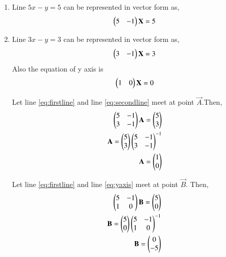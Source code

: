 \renewcommand{\theequation}{\theenumi}
\begin{enumerate}[label=\thesection.\arabic*.,ref=\thesection.\theenumi]

\item Line $5x-y=5$ can be represented in vector form as,
\begin{align}
\label{eq:firstline}
\begin{pmatrix}5&-1\end{pmatrix}\mathbf{X}=5
\end{align}

\item Line $3x-y=3$ can be represented in vector form as,
\begin{align}
\label{eq:secondline}
\begin{pmatrix}3&-1\end{pmatrix}\mathbf{X}=3
\end{align}
%
Also the equation of y axis is 
\begin{align}
\begin{pmatrix}1&0\end{pmatrix}\mathbf{X}=0
\label{eq:yaxis}
\end{align}

Let line \ref{eq:firstline} and  line \ref{eq:secondline} meet at point $\vec{A}$.Then, 
\begin{align}
\begin{pmatrix}5&-1\\3&-1\end{pmatrix}\mathbf{A} =\begin{pmatrix}5\\3\end{pmatrix}
\\
\mathbf{A}=\begin{pmatrix}5\\3\end{pmatrix}{\ensuremath{\begin{pmatrix}5&-1\\3&-1\end{pmatrix}}}^{-1}
\\
\mathbf{A}=\begin{pmatrix}1\\0\end{pmatrix}
\end{align}

Let line \ref{eq:firstline} and  line \ref{eq:yaxis} meet at point $\vec{B}$. Then, 
\begin{align}
\begin{pmatrix}5&-1\\1&0\end{pmatrix}\mathbf{B} =\begin{pmatrix}5\\0\end{pmatrix}
\\
\mathbf{B}=\begin{pmatrix}5\\0\end{pmatrix}{\ensuremath{\begin{pmatrix}5&-1\\1&0\end{pmatrix}}}^{-1}
\\
\mathbf{B}=\begin{pmatrix}0\\-5\end{pmatrix}
\end{align}


\end{enumerate}
